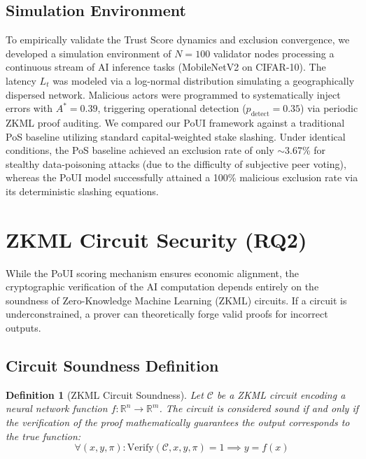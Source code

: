 \documentclass[journal]{IEEEtran}
\newtheorem{definition}{Definition}
\begin{document}
\subsection{Simulation Environment}
To empirically validate the Trust Score dynamics and exclusion convergence, we developed a simulation environment of $N=100$ validator nodes processing a continuous stream of AI inference tasks (MobileNetV2 on CIFAR-10). The latency $L_t$ was modeled via a log-normal distribution simulating a geographically dispersed network. Malicious actors were programmed to systematically inject errors with $A^* = 0.39$, triggering operational detection ($p_{\text{detect}} = 0.35$) via periodic ZKML proof auditing. We compared our PoUI framework against a traditional PoS baseline utilizing standard capital-weighted stake slashing. Under identical conditions, the PoS baseline achieved an exclusion rate of only $\sim$3.67\% for stealthy data-poisoning attacks (due to the difficulty of subjective peer voting), whereas the PoUI model successfully attained a 100\% malicious exclusion rate via its deterministic slashing equations.

\section{ZKML Circuit Security (RQ2)}
\label{sec:zkml}

While the PoUI scoring mechanism ensures economic alignment, the cryptographic verification of the AI computation depends entirely on the soundness of Zero-Knowledge Machine Learning (ZKML) circuits. If a circuit is underconstrained, a prover can theoretically forge valid proofs for incorrect outputs.

\subsection{Circuit Soundness Definition}

\begin{definition}[ZKML Circuit Soundness]
Let $\mathcal{C}$ be a ZKML circuit encoding a neural network function $f: \mathbb{R}^n \to \mathbb{R}^m$. The circuit is considered \emph{sound} if and only if the verification of the proof mathematically guarantees the output corresponds to the true function:
\[
  \forall (x, y, \pi): \text{Verify}(\mathcal{C}, x, y, \pi) = 1 \implies y = f(x)
\]
\end{definition}
\end{document}
